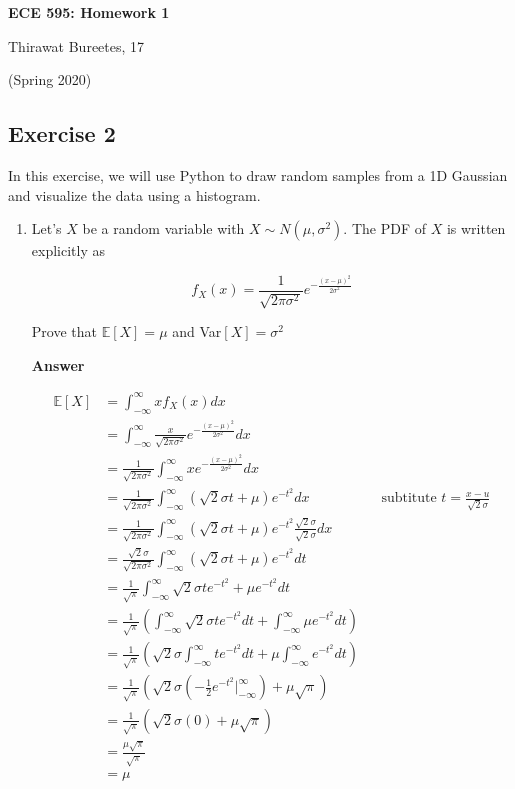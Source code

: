 \documentclass[11pt]{article}
\begin{document}
\begin{center}
\Large{\textbf{ECE 595: Homework 1}}

Thirawat Bureetes, 17

(Spring 2020)
\end{center}

\subsection*{Exercise 2}
In this exercise, we will use Python to draw random samples from a 1D Gaussian and visualize the data using a histogram.

\begin{enumerate}[label=(\alph*)]
\item Let's  $X$ be a random variable with $X \sim N(\mu, \sigma^2)$. The PDF of $X$ is written explicitly as 

\begin{equation}
f_X(x) = \frac{1}{\sqrt{2\pi\sigma^2}}e^{-\frac{(x-\mu)^2}{2\sigma^2}}
\end{equation}

Prove that $\mathbb{E}[X] = \mu$ and Var$[X] = \sigma^2$

\noindent\textbf{Answer}

\begin{align*}
\mathbb{E}[X]& = \int_{-\infty}^{\infty}xf_X(x) dx \\
&= \int_{-\infty}^{\infty}\frac{x}{\sqrt{2\pi\sigma^2}}e^{-\frac{(x-\mu)^2}{2\sigma^2}} dx \\
&= \frac{1}{\sqrt{2\pi\sigma^2}}\int_{-\infty}^{\infty}xe^{-\frac{(x-\mu)^2}{2\sigma^2}} dx \\
&= \frac{1}{\sqrt{2\pi\sigma^2}}\int_{-\infty}^{\infty}(\sqrt{2}\sigma t+\mu)e^{-t^2} dx && \text{subtitute $t = \frac{x-u}{\sqrt{2}\sigma}$} \\
&= \frac{1}{\sqrt{2\pi\sigma^2}}\int_{-\infty}^{\infty}(\sqrt{2}\sigma t+\mu)e^{-t^2}\frac{\sqrt{2}\sigma}{\sqrt{2}\sigma} dx \\
&= \frac{\sqrt{2}\sigma}{\sqrt{2\pi\sigma^2}}\int_{-\infty}^{\infty}(\sqrt{2}\sigma t+\mu)e^{-t^2}dt \\
&= \frac{1}{\sqrt{\pi}}\int_{-\infty}^{\infty}\sqrt{2}\sigma t  e^{-t^2}+\mu e^{-t^2}dt \\
&= \frac{1}{\sqrt{\pi}}(\int_{-\infty}^{\infty}\sqrt{2}\sigma t  e^{-t^2}dt+\int_{-\infty}^{\infty}\mu e^{-t^2}dt) \\
&= \frac{1}{\sqrt{\pi}}(\sqrt{2}\sigma\int_{-\infty}^{\infty} t  e^{-t^2}dt+\mu \int_{-\infty}^{\infty} e^{-t^2}dt) \\
&= \frac{1}{\sqrt{\pi}}(\sqrt{2}\sigma(-\frac{1}{2} e^{-t^2} \Big|_{-\infty}^{\infty})+\mu \sqrt{\pi}) \\
&= \frac{1}{\sqrt{\pi}}(\sqrt{2}\sigma(0)+\mu \sqrt{\pi}) \\
&= \frac{\mu \sqrt{\pi}}{\sqrt{\pi}} \\
& =\mu \\
\end{align*}


\end{enumerate}
\end{document}
